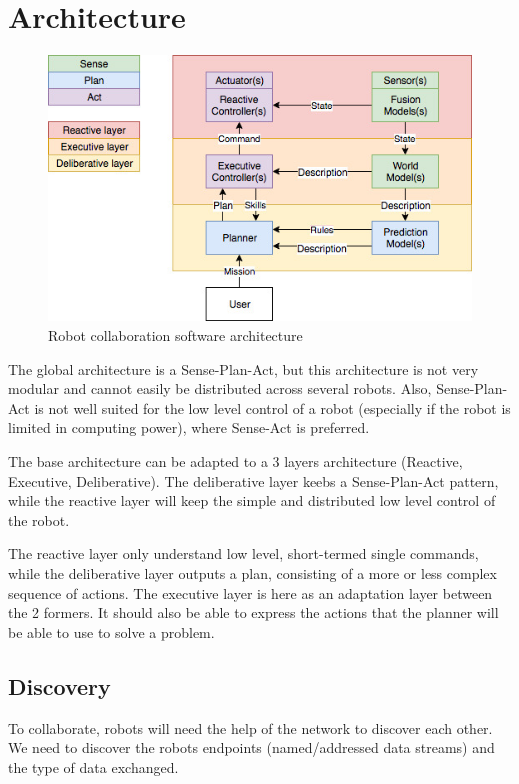\section{Architecture}

\begin{figure}
  \centering
  \caption{\label{3layers}Robot collaboration software architecture}
  \includegraphics[scale=0.40]{img/3layers}
\end{figure}

The global architecture is a Sense-Plan-Act, but this architecture is not very modular and cannot easily be distributed across several robots.
Also, Sense-Plan-Act is not well suited for the low level control of a robot (especially if the robot is limited in computing power), where Sense-Act is preferred.

The base architecture can be adapted to a 3 layers architecture (Reactive, Executive, Deliberative).
The deliberative layer keebs a Sense-Plan-Act pattern, while the reactive layer will keep the simple and distributed low level control of the robot.

The reactive layer only understand low level, short-termed single commands, while the deliberative layer outputs a plan, consisting of a more or less complex sequence of actions.
The executive layer is here as an adaptation layer between the 2 formers.
It should also be able to express the actions that the planner will be able to use to solve a problem.

\subsection{Discovery}

To collaborate, robots will need the help of the network to discover each other.
We need to discover the robots endpoints (named/addressed data streams) and the type of data exchanged.

